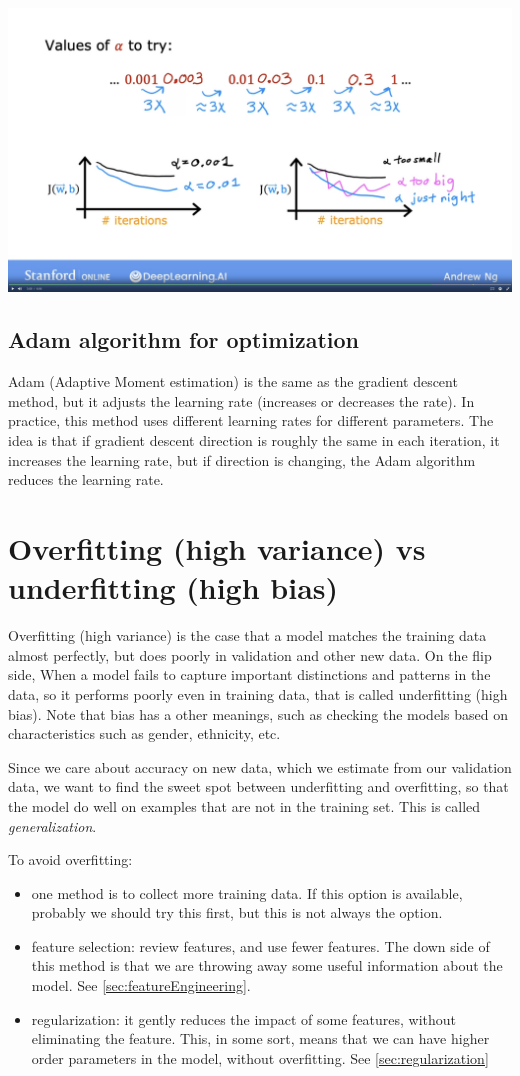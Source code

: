 \documentclass[12pt]{report}
\begin{document}
\includegraphics[scale=0.12]{pics/learningrate2.png}

\subsection{Adam algorithm for optimization}
Adam (Adaptive Moment estimation) is the same as the gradient descent method, but it adjusts the learning rate (increases or decreases the rate). In practice, this method uses different learning rates for different parameters. The idea is that if gradient descent direction is roughly the same in each iteration, it increases the learning rate, but if direction is changing, the Adam algorithm reduces the learning rate.


\section{Overfitting (high variance) vs underfitting (high bias)}
Overfitting (high variance) is the case that a model matches the training data almost perfectly, but does poorly in validation and other new data. On the flip side, When a model fails to capture important distinctions and patterns in the data, so it performs poorly even in training data, that is called underfitting (high bias). Note that bias has a other meanings, such as checking the models based on characteristics such as gender, ethnicity, etc.


Since we care about accuracy on new data, which we estimate from our validation data, we want to find the sweet spot between underfitting and overfitting, so that the model do well on examples that are not in the training set. This is called \textit{generalization}.

To avoid overfitting:
\begin{itemize}
\item one method is to collect more training data. If this option is available, probably we should try this first, but this is not always the option.
\item feature selection: review features, and use fewer features. The down side of this method is that we are throwing away some useful information about the model. See \ref{sec:featureEngineering}.
\item regularization: it gently reduces the impact of some features, without eliminating the feature. This, in some sort, means that we can have higher order parameters in the model, without overfitting. See \ref{sec:regularization}
\end{itemize}
\end{document}
